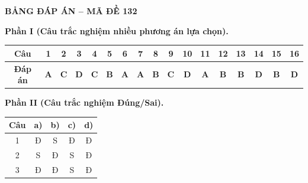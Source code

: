 \vspace{0.4cm}
\noindent\begin{minipage}{\linewidth}
\begin{center}{\large\bfseries\color{red!80!black} BẢNG ĐÁP ÁN -- MÃ ĐỀ 132}\end{center}
\vspace{0.15cm}
\noindent\textbf{Phần I (Câu trắc nghiệm nhiều phương án lựa chọn).}\par\smallskip
\begin{center}
\begin{tabular}{|c|c|c|c|c|c|c|c|c|c|c|c|c|c|c|c|c|}\hline
\textbf{Câu} & 1 & 2 & 3 & 4 & 5 & 6 & 7 & 8 & 9 & 10 & 11 & 12 & 13 & 14 & 15 & 16 \\ \hline
\textbf{Đáp án} & \textbf{A} & \textbf{C} & \textbf{D} & \textbf{C} & \textbf{B} & \textbf{A} & \textbf{A} & \textbf{B} & \textbf{C} & \textbf{D} & \textbf{A} & \textbf{B} & \textbf{B} & \textbf{D} & \textbf{B} & \textbf{D} \\ \hline
\end{tabular}
\end{center}
\noindent\textbf{Phần II (Câu trắc nghiệm Đúng/Sai).}\par\smallskip
\begin{center}
\begin{tabular}{|c|c|c|c|c|}\hline
\textbf{Câu} & \textbf{a)} & \textbf{b)} & \textbf{c)} & \textbf{d)} \\ \hline
1 & Đ & S & Đ & Đ \\ \hline
2 & S & Đ & S & Đ \\ \hline
3 & Đ & Đ & S & Đ \\ \hline
\end{tabular}
\end{center}
\end{minipage}
